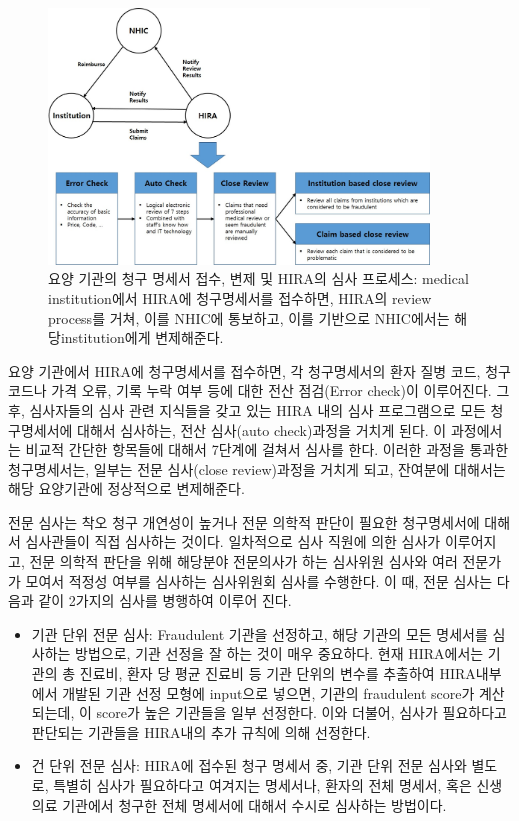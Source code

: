 \documentclass[11pt]{article}           %
\begin{document}
\begin{figure}[h]
   \centering
   \vspace{0.5cm}
   \includegraphics[width=0.9\textwidth]{[figure1]HIRA_review_process.jpg}
   \vspace{-0.5cm}
   \caption{요양 기관의 청구 명세서 접수, 변제 및 HIRA의 심사 프로세스: medical institution에서 HIRA에 청구명세서를 접수하면, HIRA의 review process를 거쳐, 이를 NHIC에 통보하고, 이를 기반으로 NHIC에서는 해당institution에게 변제해준다.}
   \vspace{0.5cm}
   \label{fig:review process}
\end{figure}

요양 기관에서 HIRA에 청구명세서를 접수하면, 각 청구명세서의 환자 질병 코드, 청구 코드나 가격 오류, 기록 누락 여부 등에 대한 전산 점검(Error check)이 이루어진다.
그 후, 심사자들의 심사 관련 지식들을 갖고 있는 HIRA 내의 심사 프로그램으로 모든 청구명세서에 대해서 심사하는, 전산 심사(auto check)과정을 거치게 된다.
이 과정에서는 비교적 간단한 항목들에 대해서 7단계에 걸쳐서 심사를 한다.
이러한 과정을 통과한 청구명세서는, 일부는 전문 심사(close review)과정을 거치게 되고, 잔여분에 대해서는 해당 요양기관에 정상적으로 변제해준다.

전문 심사는 착오 청구 개연성이 높거나 전문 의학적 판단이 필요한 청구명세서에 대해서 심사관들이 직접 심사하는 것이다.
일차적으로 심사 직원에 의한 심사가 이루어지고, 전문 의학적 판단을 위해 해당분야 전문의사가 하는 심사위원 심사와 여러 전문가가 모여서 적정성 여부를 심사하는 심사위원회 심사를 수행한다.
이 때, 전문 심사는 다음과 같이 2가지의 심사를 병행하여 이루어 진다.

\begin{itemize}
\item 기관 단위 전문 심사: Fraudulent 기관을 선정하고, 해당 기관의 모든 명세서를 심사하는 방법으로, 기관 선정을 잘 하는 것이 매우 중요하다.
현재 HIRA에서는 기관의 총 진료비, 환자 당 평균 진료비 등 기관 단위의 변수를 추출하여 HIRA내부에서 개발된 기관 선정 모형에 input으로 넣으면, 기관의 fraudulent score가 계산되는데, 이 score가 높은 기관들을 일부 선정한다.
이와 더불어, 심사가 필요하다고 판단되는 기관들을 HIRA내의 추가 규칙에 의해 선정한다.
\item 건 단위 전문 심사: HIRA에 접수된 청구 명세서 중, 기관 단위 전문 심사와 별도로, 특별히 심사가 필요하다고 여겨지는 명세서나, 환자의 전체 명세서, 혹은 신생 의료 기관에서 청구한 전체 명세서에 대해서 수시로 심사하는 방법이다.
\end{itemize}
\end{document}
